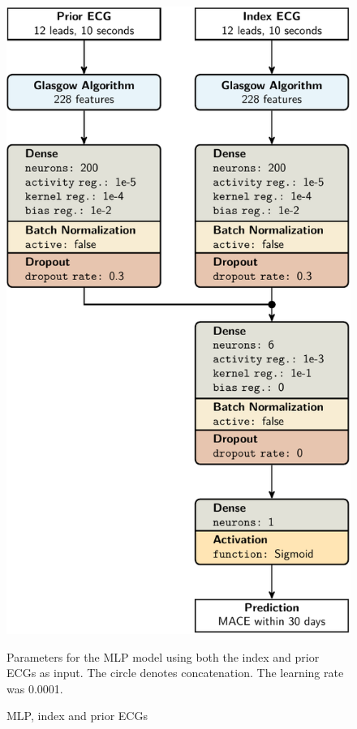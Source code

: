 \documentclass[preprint]{elsarticle}
\begin{document}
\begin{figure}[H]
\centering
\includegraphics[scale=\modelscale,keepaspectratio,trim=0 0 -16em 0]{figures/model-mlp2.pdf}
\caption{MLP, index and prior ECGs}
\medskip
\small
Parameters for the MLP model using both the index and prior ECGs as input. The circle denotes concatenation. The learning rate was 0.0001.
\end{figure}
\end{document}
